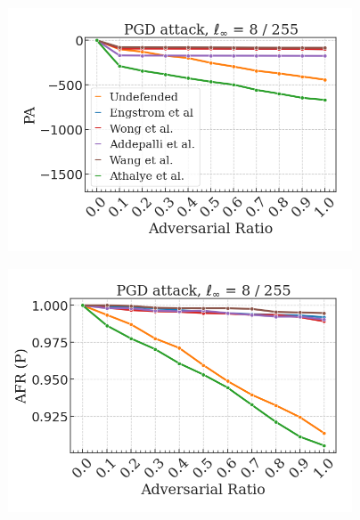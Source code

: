 \begin{figure}[H]
    \centering
    \begin{subfigure}[b]{0.45\textwidth}
        \centering
        \includegraphics[width=\textwidth]{img/results_discussion/adversarial/PGD_0.0314_logPA_linear.png}
    \end{subfigure}
    \begin{subfigure}[b]{0.45\textwidth}
        \centering
        \includegraphics[width=\textwidth]{img/results_discussion/adversarial/PGD_0.0314_AFR_pred.png}
    \end{subfigure}

    \vspace{1em}


\end{figure}
